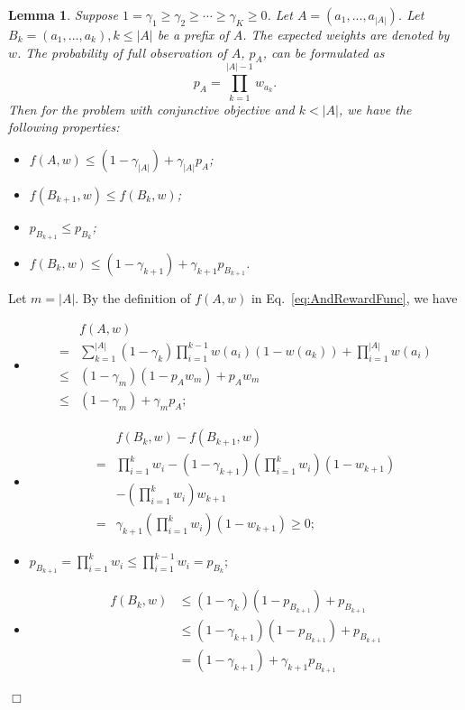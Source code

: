 \documentclass{article}
\newcommand{\abs}[1]{\left| #1 \right|}
\newtheorem{lemma}[theorem]{Lemma}%
\newenvironment{proof}{\noindent {\textbf{Proof. }}}{$\Box$ \medskip}
\begin{document}
\begin{lemma} %
	\label{lem:prefixRelation}
	Suppose $1 = \gamma_1 \geq \gamma_2 \geq \cdots \geq \gamma_K \geq 0$. Let $A = (a_1, ..., a_{\abs{A}})$. Let $B_k = (a_1, ..., a_k), k \leq \abs{A}$ be a prefix of $A$. The expected weights are denoted by $w$. The probability of full observation of $A$, $p_{A}$, can be formulated as
	$$
	p_{A} = \prod_{k=1}^{\abs{A}-1} w_{a_k}.
	$$
	Then for the problem with conjunctive objective and $k < \abs{A}$, we have the following properties:
	\begin{itemize}
		\item[(1)] $f(A, w) \leq (1-\gamma_{\abs{A}}) + \gamma_{\abs{A}} p_{A}$;
		\item[(2)] $f(B_{k+1}, w) \leq f(B_k, w)$;
		\item[(3)] $p_{B_{k+1}} \leq p_{B_k}$;
		\item[(4)] $f(B_k, w) \leq (1-\gamma_{k+1}) + \gamma_{k+1} p_{B_{k+1}}$.
	\end{itemize}
\end{lemma}
\begin{proof}
	Let $m = |A|$. By the definition of $f(A,w)$ in Eq.~\eqref{eq:AndRewardFunc}, we have
	\begin{itemize}
		\item[(1)]
		\begin{align*}
		&f(A,w) \\
		=& \sum_{k = 1}^{\abs{A}} (1-\gamma_k) \prod_{i = 1}^{k - 1} w(a_i) (1 - w(a_k)) + \prod_{i=1}^{\abs{A}}w(a_i) \\
		\leq& (1-\gamma_m)(1 - p_{A} w_m) + p_{A} w_m \\
		\leq& (1-\gamma_m) + \gamma_m p_{A};
		\end{align*}
		
		\item[(2)]
		\begin{align*}
		&f(B_k, w) - f(B_{k+1}, w)\\
		=&\prod_{i=1}^{k}w_i - (1-\gamma_{k+1}) (\prod_{i=1}^{k}w_i) (1 - w_{k+1}) \\
		&- (\prod_{i=1}^{k}w_i) w_{k+1}\\
		=&\gamma_{k+1} (\prod_{i=1}^{k}w_i) (1 - w_{k+1}) \geq 0;
		\end{align*}
		
		\item[(3)]
		$p_{B_{k+1}} = \prod_{i=1}^{k} w_i \leq \prod_{i=1}^{k-1} w_i = p_{B_k}$;
		
		\item[(4)]
		\begin{align*}
		f(B_k, w) & \leq (1-\gamma_k) (1 - p_{B_{k+1}}) + p_{B_{k+1}}\\
		&\leq (1-\gamma_{k+1}) (1 - p_{B_{k+1}}) + p_{B_{k+1}} \\
		&= (1-\gamma_{k+1}) + \gamma_{k+1} p_{B_{k+1}}
		\end{align*}
	\end{itemize}
\end{proof}
\end{document}
